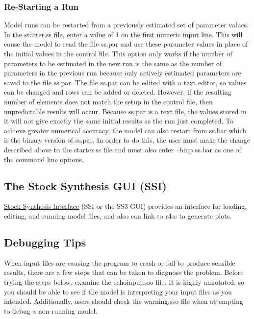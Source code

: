 \subsubsection{Re-Starting a Run}
Model runs can be restarted from a previously estimated set of parameter values. In the starter.ss file, enter a value of 1 on the first numeric input line. This will cause the model to read the file ss.par and use these parameter values in place of the initial values in the control file. This option only works if the number of parameters to be estimated in the new run is the same as the number of parameters in the previous run because only actively estimated parameters are saved to the file ss.par. The file ss.par can be edited with a text editor, so values can be changed and rows can be added or deleted.  However, if the resulting number of elements does not match the setup in the control file, then unpredictable results will occur. Because ss.par is a text file, the values stored in it will not give exactly the same initial results as the run just completed. To achieve greater numerical accuracy, the model can also restart from ss.bar which is the binary version of ss.par. In order to do this, the user must make the change described above to the starter.ss file and must also enter –binp ss.bar as one of the command line options.

\subsection{The Stock Synthesis GUI (SSI)}
\href{https://vlab.noaa.gov/web/stock-synthesis/document-library/-/document_library/0LmuycloZeIt/view/5042951}{Stock Synthesis Interface} (SSI or the SS3 GUI) provides an interface for loading, editing, and running model files, and also can link to r4ss to generate plots.

\subsection{Debugging Tips}
When input files are causing the program to crash or fail to produce sensible results, there are a few steps that can be taken to diagnose the problem.  Before trying the steps below, examine the echoinput.sso file.  It is highly annotated, so you should be able to see if the model is interpreting your input files as you intended.  Additionally, users should check the warning.sso file when attempting to debug a non-running model.

